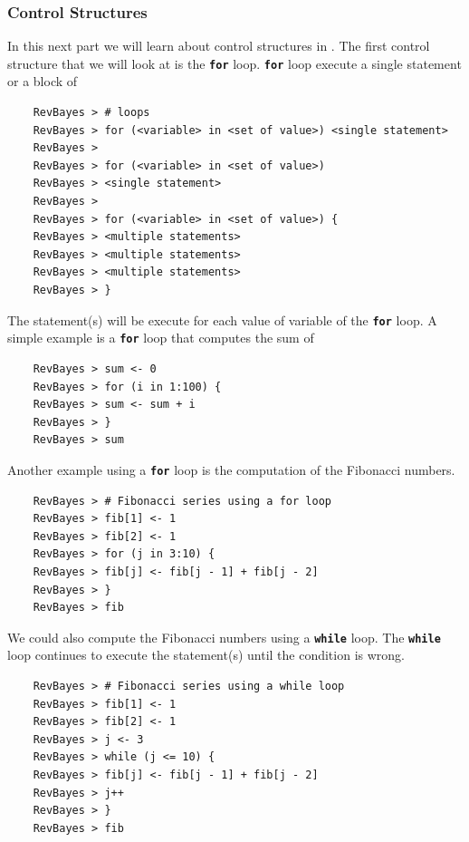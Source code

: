 \documentclass[11pt]{article}
\newcommand{\cl}[1]{{\texttt{\textbf{#1}}}}
\begin{document}
\subsubsection*{Control Structures}
In this next part we will learn about control structures in \Rev. 
The first control structure that we will look at is the \cl{for} loop.
\cl{for} loop execute a single statement or a block of 
{\tt \begin{snugshade*}
\begin{lstlisting}    
    RevBayes > # loops
    RevBayes > for (<variable> in <set of value>) <single statement>
    RevBayes > 
    RevBayes > for (<variable> in <set of value>) 
    RevBayes > <single statement>
    RevBayes >
    RevBayes > for (<variable> in <set of value>) {
    RevBayes > <multiple statements>
    RevBayes > <multiple statements>
    RevBayes > <multiple statements>
    RevBayes > }
\end{lstlisting}
\end{snugshade*}}
The statement(s) will be execute for each value of variable of the \cl{for} loop.
A simple example is a \cl{for} loop that computes the sum of 
{\tt \begin{snugshade*}
\begin{lstlisting}    
    RevBayes > sum <- 0
    RevBayes > for (i in 1:100) {
    RevBayes > sum <- sum + i
    RevBayes > }
    RevBayes > sum
\end{lstlisting}
\end{snugshade*}}
Another example using a \cl{for} loop is the computation of the Fibonacci numbers.
{\tt \begin{snugshade*}
\begin{lstlisting}    
    RevBayes > # Fibonacci series using a for loop
    RevBayes > fib[1] <- 1
    RevBayes > fib[2] <- 1
    RevBayes > for (j in 3:10) {
    RevBayes > fib[j] <- fib[j - 1] + fib[j - 2]
    RevBayes > }
    RevBayes > fib
\end{lstlisting}
\end{snugshade*}}
We could also compute the Fibonacci numbers using a \cl{while} loop.
The \cl{while} loop continues to execute the statement(s) until the condition is wrong.
{\tt \begin{snugshade*}
\begin{lstlisting}    
    RevBayes > # Fibonacci series using a while loop
    RevBayes > fib[1] <- 1
    RevBayes > fib[2] <- 1
    RevBayes > j <- 3
    RevBayes > while (j <= 10) {
    RevBayes > fib[j] <- fib[j - 1] + fib[j - 2]
    RevBayes > j++
    RevBayes > }
    RevBayes > fib
\end{lstlisting}
\end{snugshade*}}
\end{document}
